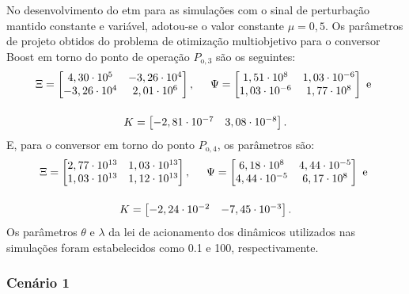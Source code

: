 No desenvolvimento do \acrshort{etm} para as simulações com o sinal de perturbação mantido constante e variável, adotou-se o valor constante $\mu = 0,5$. Os parâmetros de projeto obtidos do problema de otimização multiobjetivo para o conversor Boost em torno do ponto de operação $P_{\mathrm{o}, 3}$ são os seguintes: \begin{gather}
  \Xi = \begin{bmatrix}
    4,30 \cdot 10^5  & -3,26 \cdot 10^4 \\
    -3,26 \cdot 10^4 & 2,01 \cdot 10^6  \\
  \end{bmatrix}, \hspace{.5cm}
  \Psi = \begin{bmatrix}
    1,51 \cdot 10^8    & 1,03 \cdot 10^{-6} \\
    1,03 \cdot 10^{-6} & 1,77 \cdot 10^8    \\
  \end{bmatrix} \text{ e } \notag \\[12pt]
  K = \begin{bmatrix}
    -2,81 \cdot 10^{-7} & 3,08 \cdot 10^{-8}
  \end{bmatrix} . \notag
\end{gather} E, para o conversor em torno do ponto $P_{\mathrm{o}, 4}$, os parâmetros são: \begin{gather}
  \Xi = \begin{bmatrix}
    2,77\cdot 10^{13} & 1,03\cdot 10^{13} \\
    1,03\cdot 10^{13} & 1,12\cdot 10^{13} \\
  \end{bmatrix}, \hspace{.5cm}
  \Psi = \begin{bmatrix}
    6,18\cdot 10^{8}  & 4,44\cdot 10^{-5} \\
    4,44\cdot 10^{-5} & 6,17\cdot 10^{8}  \\
  \end{bmatrix} \text{ e } \notag \\[12pt]
  K = \begin{bmatrix}
    -2,24 \cdot 10^{-2} & -7,45\cdot 10^{-3}
  \end{bmatrix} . \notag
\end{gather} Os parâmetros $\theta$ e $\lambda$ da lei de acionamento dos  dinâmicos utilizados nas simulações foram estabelecidos como 0.1 e 100, respectivamente.

\subsubsection{Cenário 1}

